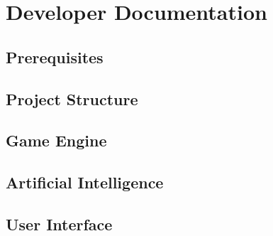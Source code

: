 \section{Developer Documentation}

\subsection{Prerequisites}

\subsection{Project Structure}

\subsection{Game Engine}

\subsection{Artificial Intelligence}

\subsection{User Interface}
